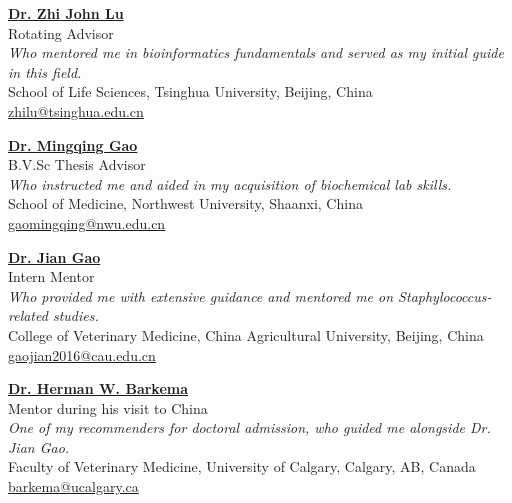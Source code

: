 \vspace{4pt}


\textbf{\href{https://life.tsinghua.edu.cn/lifeen/info/1034/1083.htm}{Dr. Zhi John Lu}}\\
Rotating Advisor\\
\textit{Who mentored me in bioinformatics fundamentals and served as my initial guide in this field.}\\
School of Life Sciences, Tsinghua University, Beijing, China\\
\href{mailto:zhilu@tsinghua.edu.cn}{zhilu@tsinghua.edu.cn}\\

\vspace{4pt}


\textbf{\href{https://faculty.nwu.edu.cn/gaomingqing/zh_CN/index.htm}{Dr. Mingqing Gao}}\\
B.V.Sc Thesis Advisor\\
\textit{Who instructed me and aided in my acquisition of biochemical lab skills.}\\
School of Medicine, Northwest University, Shaanxi, China\\
\href{mailto:gaomingqing@nwu.edu.cn}{gaomingqing@nwu.edu.cn}\\


\vspace{4pt}


\textbf{\href{https://cvm.cau.edu.cn/art/2017/9/12/art_41957_71.html}{Dr. Jian Gao}}\\
Intern Mentor \\
\textit{Who provided me with extensive guidance and mentored me on \textit{Staphylococcus}-related studies.} \\
College of Veterinary Medicine, China Agricultural University, Beijing, China\\
\href{mailto:gaojian2016@cau.edu.cn}{gaojian2016@cau.edu.cn}\\

\vspace{4pt}

\textbf{\href{https://profiles.ucalgary.ca/herman-barkema}{Dr. Herman W. Barkema}}\\
Mentor during his visit to China \\
\textit{One of my recommenders for doctoral admission, who guided me alongside Dr. Jian Gao.} \\
Faculty of Veterinary Medicine, University of Calgary, Calgary, AB, Canada\\
\href{mailto:barkema@ucalgary.ca}{barkema@ucalgary.ca}\\

